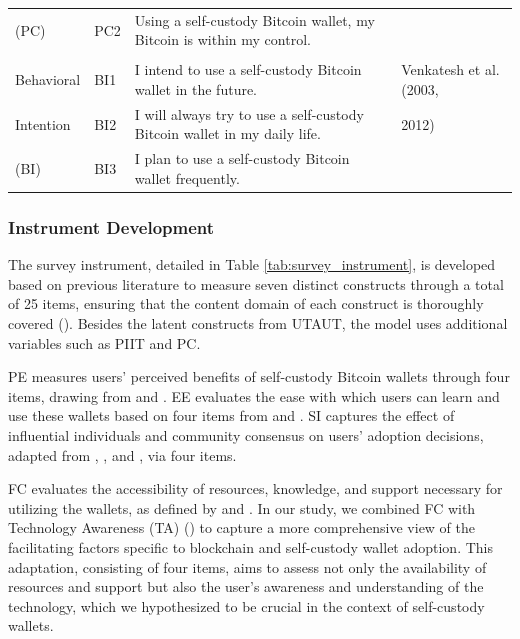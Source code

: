 \documentclass[twocolumn]{article}
\begin{document}
\begin{table}[pb]
\begin{tabular}{@{}p{1.7cm}p{0.7cm}p{10cm}p{3.8cm}@{}}
(PC)                                      & PC2           & Using a self-custody Bitcoin wallet, my Bitcoin is within my control. &  \\
\\Behavioral                              & BI1           & I intend to use a self-custody Bitcoin wallet in the future. & Venkatesh et al. (2003,  \\
Intention                                 & BI2           & I will always try to use a self-custody Bitcoin wallet in my daily life. & 2012) \\
(BI)                                      & BI3           & I plan to use a self-custody Bitcoin wallet frequently. \\ \bottomrule
\end{tabular}
\end{table}

\subsubsection{Instrument Development}

The survey instrument, detailed in Table \ref{tab:survey_instrument}, is developed based on previous literature to measure seven distinct constructs through a total of 25 items, ensuring that the content domain of each construct is thoroughly covered (\cite{agarwal_conceptual_1998, venkatesh_consumer_2012, venkatesh_user_2003, queiroz_blockchain_2019, wong_unearthing_2020, albayati_accepting_2020, dinev_centrality_2007, leong_predicting_2013, taylor_understanding_1995, cabinakova_understanding_2019}). Besides the latent constructs from UTAUT, the model uses additional variables such as PIIT and PC. 

PE measures users' perceived benefits of self-custody Bitcoin wallets through four items, drawing from \textcite{queiroz_blockchain_2019} and \textcite{venkatesh_user_2003, venkatesh_consumer_2012}. EE evaluates the ease with which users can learn and use these wallets based on four items from \textcite{venkatesh_user_2003, venkatesh_consumer_2012} and \textcite{wong_unearthing_2020}. SI captures the effect of influential individuals and community consensus on users' adoption decisions, adapted from \textcite{albayati_accepting_2020}, \textcite{queiroz_blockchain_2019}, and \textcite{venkatesh_user_2003}, via four items. 

FC evaluates the accessibility of resources, knowledge, and support necessary for utilizing the wallets, as defined by \textcite{queiroz_blockchain_2019} and \textcite{venkatesh_user_2003, venkatesh_consumer_2012}. In our study, we combined FC with Technology Awareness (TA) (\cite{dinev_centrality_2007}) to capture a more comprehensive view of the facilitating factors specific to blockchain and self-custody wallet adoption. This adaptation, consisting of four items, aims to assess not only the availability of resources and support but also the user's awareness and understanding of the technology, which we hypothesized to be crucial in the context of self-custody wallets.
\end{document}
